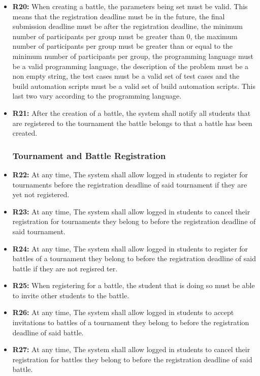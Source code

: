 \documentclass{article}
\begin{document}
\begin{itemize}
    \item \textbf{R20:} When creating a battle, the parameters being set must be valid. This means that the registration deadline must be in the future, the final submission deadline must be after the registration deadline, the minimum number of participants per group must be greater than 0, the maximum number of participants per group must be greater than or equal to the minimum number of participants per group, the programming language must be a valid programming language, the description of the problem must be a non empty string, the test cases must be a valid set of test cases and the build automation scripts must be a valid set of build automation scripts. This last two vary according to the programming language.
    \item \textbf{R21:} After the creation of a battle, the system shall notify all students that are registered to the tournament the battle belongs to that a battle has been created.

    \subsubsection*{Tournament and Battle Registration}

    \item \textbf{R22:} At any time, The system shall allow logged in students to register for tournaments before the registration deadline of said tournament if they are yet not registered.
    \item \textbf{R23:} At any time, The system shall allow logged in students to cancel their registration for tournaments they belong to before the registration deadline of said tournament.
    \item \textbf{R24:} At any time, The system shall allow logged in students to register for battles of a tournament they belong to before the registration deadline of said battle if they are not regisred ter.
    \item \textbf{R25:} When registering for a battle, the student that is doing so must be able to invite other students to the battle.
    \item \textbf{R26:} At any time, The system shall allow logged in students to accept invitations to battles of a tournament they belong to before the registration deadline of said battle.
    \item \textbf{R27:} At any time, The system shall allow logged in students to cancel their registration for battles they belong to before the registration deadline of said battle.
    

\end{itemize}
\end{document}
